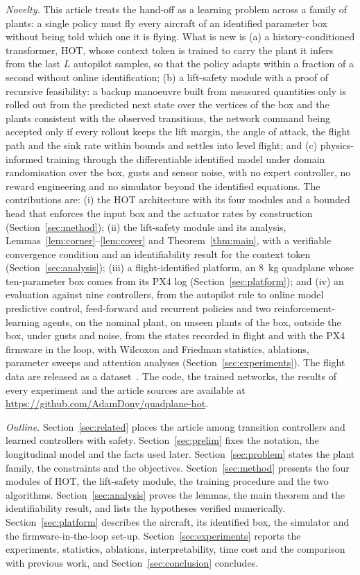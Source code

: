 \emph{Novelty.} This article treats the hand-off as a learning problem across a family of plants: a single policy must fly every aircraft of an identified parameter box without being told which one it is flying. What is new is (a) a history-conditioned transformer, HOT, whose context token is trained to carry the plant it infers from the last $L$ autopilot samples, so that the policy adapts within a fraction of a second without online identification; (b) a lift-safety module with a proof of recursive feasibility: a backup manoeuvre built from measured quantities only is rolled out from the predicted next state over the vertices of the box and the plants consistent with the observed transitions, the network command being accepted only if every rollout keeps the lift margin, the angle of attack, the flight path and the sink rate within bounds and settles into level flight; and (c) physics-informed training through the differentiable identified model under domain randomisation over the box, gusts and sensor noise, with no expert controller, no reward engineering and no simulator beyond the identified equations. The contributions are: (i) the HOT architecture with its four modules and a bounded head that enforces the input box and the actuator rates by construction (Section~\ref{sec:method}); (ii) the lift-safety module and its analysis, Lemmas~\ref{lem:corner}--\ref{lem:cover} and Theorem~\ref{thm:main}, with a verifiable convergence condition and an identifiability result for the context token (Section~\ref{sec:analysis}); (iii) a flight-identified platform, an \SI{8}{kg} quadplane whose ten-parameter box comes from its PX4 log (Section~\ref{sec:platform}); and (iv) an evaluation against nine controllers, from the autopilot rule to online model predictive control, feed-forward and recurrent policies and two reinforcement-learning agents, on the nominal plant, on \numCross{} unseen plants of the box, outside the box, under gusts and noise, from the states recorded in flight and with the PX4 firmware in the loop, with Wilcoxon and Friedman statistics, ablations, parameter sweeps and attention analyses (Section~\ref{sec:experiments}). The flight data are released as a dataset~\cite{Dony2026data}. The code, the trained networks, the results of every experiment and the article sources are available at \url{https://github.com/AdamDony/quadplane-hot}.

\emph{Outline.} Section~\ref{sec:related} places the article among transition controllers and learned controllers with safety. Section~\ref{sec:prelim} fixes the notation, the longitudinal model and the facts used later. Section~\ref{sec:problem} states the plant family, the constraints and the objectives. Section~\ref{sec:method} presents the four modules of HOT, the lift-safety module, the training procedure and the two algorithms. Section~\ref{sec:analysis} proves the lemmas, the main theorem and the identifiability result, and lists the hypotheses verified numerically. Section~\ref{sec:platform} describes the aircraft, its identified box, the simulator and the firmware-in-the-loop set-up. Section~\ref{sec:experiments} reports the experiments, statistics, ablations, interpretability, time cost and the comparison with previous work, and Section~\ref{sec:conclusion} concludes.
